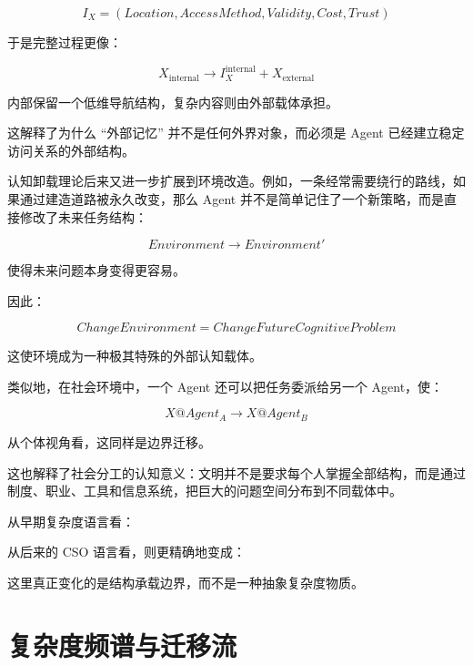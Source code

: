 \[
I_X
=
(
Location,
AccessMethod,
Validity,
Cost,
Trust
)
\]

于是完整过程更像：

\[
X_{\mathrm{internal}}
\rightarrow
I_X^{\mathrm{internal}}
+
X_{\mathrm{external}}
\]

内部保留一个低维导航结构，复杂内容则由外部载体承担。

这解释了为什么 ``外部记忆'' 并不是任何外界对象，而必须是 Agent 已经建立稳定访问关系的外部结构。

认知卸载理论后来又进一步扩展到环境改造。例如，一条经常需要绕行的路线，如果通过建造道路被永久改变，那么 Agent 并不是简单记住了一个新策略，而是直接修改了未来任务结构：

\[
Environment
\rightarrow
Environment'
\]

使得未来问题本身变得更容易。

因此：

\[
\boxed{
ChangeEnvironment
=
ChangeFutureCognitiveProblem
}
\]

这使环境成为一种极其特殊的外部认知载体。

类似地，在社会环境中，一个 Agent 还可以把任务委派给另一个 Agent，使：

\[
X@Agent_A
\rightarrow
X@Agent_B
\]

从个体视角看，这同样是边界迁移。

这也解释了社会分工的认知意义：文明并不是要求每个人掌握全部结构，而是通过制度、职业、工具和信息系统，把巨大的问题空间分布到不同载体中。

从早期复杂度语言看：

\begin{statementbox}
\centering
{}
\end{statementbox}

从后来的 CSO 语言看，则更精确地变成：

\begin{statementbox}
\centering
{}
\end{statementbox}

这里真正变化的是结构承载边界，而不是一种抽象复杂度物质。

\section{复杂度频谱与迁移流}
\label{sec:complexity-spectrum-flow}

